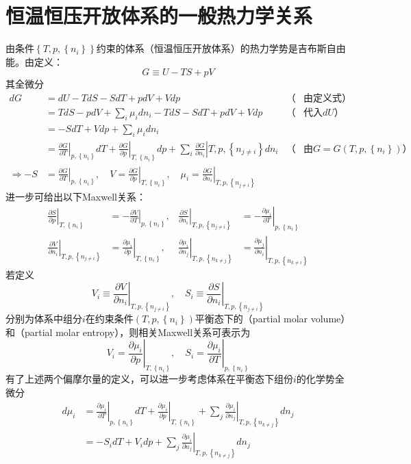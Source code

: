 \documentclass[main.tex]{subfiles}
\begin{document}
\section{恒温恒压开放体系的一般热力学关系}
由条件$\left\{T,p,\left\{n_i\right\}\right\}$约束的体系（恒温恒压开放体系）的热力学势是吉布斯自由能。由定义：
\[G\equiv U-TS+pV\]
其全微分
\begin{align*}
dG&=dU-TdS-SdT+pdV+Vdp&\text{（}&\text{由定义式）}\\
&=TdS-pdV+\sum_i\mu_idn_i-TdS-SdT+pdV+Vdp&\text{（}&\text{代入$dU$）}\\
&=-SdT+Vdp+\sum_i\mu_idn_i\\
&=\left.\frac{\partial G}{\partial T}\right|_{p,\left\{n_i\right\}}dT+\left.\frac{\partial G}{\partial p}\right|_{T,\left\{n_i\right\}}dp+\sum_i\left.\frac{\partial G}{\partial n_i}\right|{T,p,\left\{n_{j\neq i}\right\}}dn_i&\text{（}&\text{由$G=G\left(T,p,\left\{n_i\right\}\right)$）}\\
\Rightarrow -S&=\left.\frac{\partial G}{\partial T}\right|_{p,\left\{n_i\right\}},\quad V=\left.\frac{\partial G}{\partial p}\right|_{T,\left\{n_i\right\}},\quad\mu_i=\left.\frac{\partial G}{\partial n_i}\right|_{T,p,\left\{n_{j\neq i}\right\}}
\end{align*}
进一步可给出以下Maxwell关系：
\begin{align*}
\left.\frac{\partial S}{\partial p}\right|_{T,\left\{n_i\right\}}&=-\left.\frac{\partial V}{\partial T}\right|_{p,\left\{n_i\right\}},&\left.\frac{\partial S}{\partial n_i}\right|_{T,p,\left\{n_{j\neq i}\right\}}&=-\left.\frac{\partial\mu_i}{\partial T}\right|_{p,\left\{n_i\right\}}\\
\left.\frac{\partial V}{\partial n_i}\right|_{T,p,\left\{n_{j\neq i}\right\}}&=\left.\frac{\partial \mu_i}{\partial p}\right|_{T,\left\{n_i\right\}},&\left.\frac{\partial\mu_i}{\partial n_j}\right|_{T,p,\left\{n_{k\neq j}\right\}}&=\left.\frac{\partial\mu_j}{\partial n_i}\right|_{T,p,\left\{n_{k\neq i}\right\}}
\end{align*}
若定义
\[V_i\equiv\left.\frac{\partial V}{\partial n_i}\right|_{T,p,\left\{n_{j\neq i}\right\}},\quad S_i\equiv\left.\frac{\partial S}{\partial n_i}\right|_{T,p,\left\{n_{j\neq i}\right\}}\]
分别为体系中组分$i$在约束条件$\left(T,p,\left\{n_i\right\}\right)$平衡态下的（partial molar volume）和（partial molar entropy），则相关Maxwell关系可表示为
\[V_i=\left.\frac{\partial\mu_i}{\partial p}\right|_{T,\left\{n_i\right\}},\quad S_i=\left.\frac{\partial\mu_i}{\partial T}\right|_{p,\left\{n_i\right\}}\]
有了上述两个偏摩尔量的定义，可以进一步考虑体系在平衡态下组份$i$的化学势全微分
\begin{align*}
d\mu_i&=\left.\frac{\partial\mu_i}{\partial T}\right|_{p,\left\{n_i\right\}}dT+\left.\frac{\partial\mu_i}{\partial p}\right|_{T,\left\{n_i\right\}}+\sum_j\left.\frac{\partial\mu_i}{\partial n_j}\right|_{T,p,\left\{n_{k\neq j}\right\}}dn_j\\
&=-S_idT+V_idp+\sum_j\left.\frac{\partial\mu_i}{\partial n_j}\right|_{T,p,\left\{n_{k\neq j}\right\}}dn_j
\end{align*}
\end{document}
